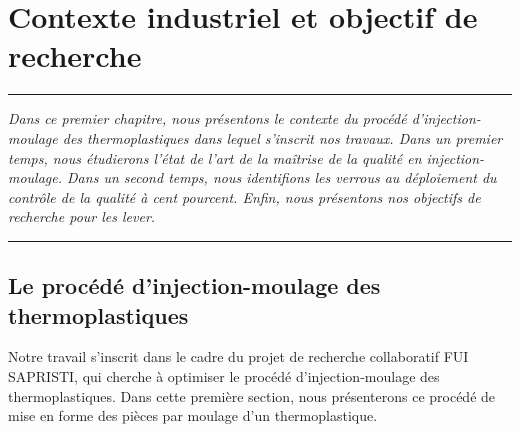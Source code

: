 
\lhead[\fancyplain{}{\leftmark}]%
      {\fancyplain{}{}} %
\chead[\fancyplain{}{}]%
      {\fancyplain{}{}}
\rhead[\fancyplain{}{}]%
      {\fancyplain{}{\rightmark}}%
\lfoot[\fancyplain{}{}]%
      {\fancyplain{}{}}
\cfoot[\fancyplain{}{\thepage}]%
      {\fancyplain{}{\thepage}} %
\rfoot[\fancyplain{}{}]%
     {\fancyplain{}{\scriptsize}}



\chapter{Contexte industriel et objectif de recherche}
\label{ch:objectives}


\begin{center}
\rule{0.7\linewidth}{.5pt}
\begin{minipage}{0.7\linewidth}
\smallskip

\textit{
Dans ce premier chapitre, nous présentons le contexte du procédé d'injection-moulage des thermoplastiques dans lequel s'inscrit nos travaux.
Dans un premier temps, nous étudierons l'état de l'art de la maîtrise de la qualité en injection-moulage.
Dans un second temps, nous identifions les verrous au déploiement du contrôle de la qualité à cent pourcent.
Enfin, nous présentons nos objectifs de recherche pour les lever.
}

\end{minipage}
\smallskip
\rule{0.7\linewidth}{.5pt}
\end{center}

\minitoc
\newpage

\section{Le procédé d'injection-moulage des thermoplastiques}  \label{sec:molding_presentation}
Notre travail s'inscrit dans le cadre du projet de recherche collaboratif FUI SAPRISTI, qui cherche à optimiser le procédé d'injection-moulage des thermoplastiques.
Dans cette première section, nous présenterons ce procédé de mise en forme des pièces par moulage d'un thermoplastique.

